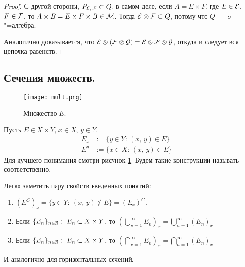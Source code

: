 \begin{claim}
\begin{proof}
        С другой стороны, $P_{\mathcal{E},\, \mathcal{F} }\subset Q$, в самом деле, если $A=E\times F$, где $E\in\mathcal{E}$, $F\in\mathcal{F} $, то
        $A\times B = E\times F\times B\in \mathcal{M}$.
        Тогда $\mathcal{E}\otimes\mathcal{F} \subset Q$, потому что $Q$~--- $\sigma$"=алгебра.

        Аналогично доказывается, что $\mathcal{E}\otimes(\mathcal{F} \otimes\mathcal{G})=\mathcal{E}\otimes\mathcal{F} \otimes\mathcal{G}$, откуда и следует вся
        цепочка равенств.

    \end{proof}
\end{claim}

\subsection{Сечения множеств.}

\begin{figure}[!ht]
    \centering
    \texttt{[image: mult.png]}
    \caption{Множество $E$.}
    \label{lect4:fig:mult}
\end{figure}

\begin{definition}
    Пусть $E\in X\times Y,\, x\in X,\, y\in Y$. 
    \begin{align*}
        E_x&:=\{y\in Y:\ (x,\, y)\in E\}\\
        E^y&:=\{x\in X:\ (x,\, y)\in E\}
    \end{align*}
    Для лучшего понимания смотри рисунок \ref{lect4:fig:mult}. Будем такие конструкции называть  соответственно.
\end{definition}

\begin{remark}
    Легко заметить пару свойств введенных понятий:
    \begin{enumerate}[label=\arabic*\degree.]
        \item $(E^C)_x = \{y\in Y:\ (x,\, y)\notin E\}=(E_x)^C.$
        \item Если $\{E_n\}_{n\in\mathbb{N}}:\ E_n\subset X\times Y$, то 
        $\left(\bigcup\limits_{n=1}^{\infty}E_n\right)_x=\bigcup\limits_{n=1}^{\infty}\left(E_n\right)_x$
        \item Если $\{E_n\}_{n\in\mathbb{N}}:\ E_n\subset X\times Y$, то 
        $\left(\bigcap\limits_{n=1}^{\infty}E_n\right)_x=\bigcap\limits_{n=1}^{\infty}\left(E_n\right)_x$
    \end{enumerate}
    И аналогично для горизонтальных сечений.
\end{remark}

